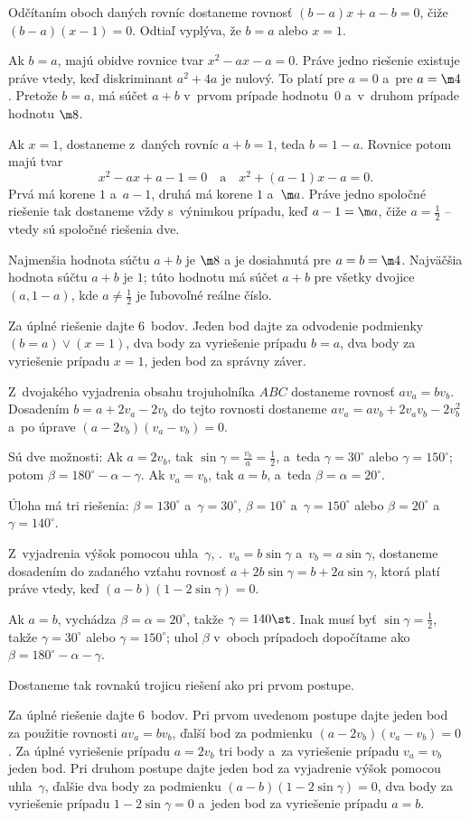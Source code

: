 {%
Odčítaním oboch daných rovníc dostaneme rovnosť $(b-a)x+a-b=0$, čiže $(b-a)(x-1)=0$. Odtiaľ vyplýva, že $b=a$ alebo $x=1$.

Ak $b=a$, majú obidve rovnice tvar $x^2-ax-a=0$. Práve jedno riešenie existuje práve vtedy, keď diskriminant $a^2+4a$ je nulový. To platí pre $a=0$ a~pre $a=\m4$. Pretože $b=a$, má súčet $a+b$ v~prvom prípade hodnotu~$0$ a~v~druhom prípade hodnotu $\m8$.

Ak $x=1$, dostaneme z~daných rovníc $a+b=1$, teda $b=1-a$. Rovnice potom majú tvar
$$
x^2-ax+a-1=0\quad\text{a}\quad x^2+(a-1)x-a=0.
$$
Prvá má korene $1$ a~$a-1$, druhá má korene $1$ a~$\m a$. Práve jedno spoločné riešenie tak dostaneme vždy s~výnimkou prípadu, keď $a-1=\m a$, čiže $a=\frac12$ -- vtedy sú spoločné riešenia dve.

\zaver
Najmenšia hodnota súčtu $a+b$ je $\m8$ a je dosiahnutá pre $a=b=\m4$. Najväčšia hodnota súčtu $a+b$ je $1$; túto hodnotu má súčet $a+b$ pre všetky dvojice $(a,1-a)$, kde $a\ne\frac12$ je ľubovoľné reálne číslo.

\nobreak\medskip\petit\noindent
Za úplné riešenie dajte 6~bodov.
Jeden bod dajte za odvodenie podmienky $(b=a) \vee (x=1)$, dva body za vyriešenie prípadu $b=a$, dva body za vyriešenie prípadu $x=1$, jeden bod za správny záver.
\endpetit
\bigbreak}

{%
Z~dvojakého vyjadrenia obsahu trojuholníka $ABC$ dostaneme rovnosť $av_a=bv_b$. Dosadením $b=a+2v_a-2v_b$ do tejto rovnosti dostaneme $av_a=av_b+2v_av_b-2v_b^2$ a~po úprave $(a-2v_b)(v_a-v_b)=0$.

Sú dve možnosti: Ak $a=2v_b$, tak $\sin\gamma =\frac{v_b}a=\frac12$, a~teda $\gamma=30^\circ$ alebo $\gamma=150^\circ$; potom $\beta=180^\circ-\alpha-\gamma$. Ak $v_a=v_b$, tak $a=b$, a~teda $\beta=\alpha=20^\circ$.

Úloha má tri riešenia: $\beta=130^\circ$ a~$\gamma=30^\circ$, $\beta=10^\circ$ a~$\gamma=150^\circ$ alebo $\beta=20^\circ$ a~$\gamma=140^\circ$.

\ineriesenie
Z~vyjadrenia výšok pomocou uhla~$\gamma$, \tj.~$v_a=b\sin\gamma$ a~$v_b=a\sin\gamma$,
dostaneme dosadením do zadaného vzťahu rovnosť $a+2b\sin\gamma=b+2a\sin\gamma$, ktorá platí práve vtedy, keď
$(a-b)(1-2\sin\gamma)=0$.

Ak $a=b$, vychádza $\beta=\alpha=20^\circ$, takže $\gamma=140\st$. Inak musí byť $\sin \gamma =\frac12$, takže $\gamma=30^\circ$ alebo $\gamma=150^\circ$; uhol $\beta$ v~oboch prípadoch dopočítame ako $\beta=180^\circ-\alpha-\gamma$.

Dostaneme tak rovnakú trojicu riešení ako pri prvom postupe.

\nobreak\medskip\petit\noindent
Za úplné riešenie dajte 6~bodov. Pri prvom uvedenom postupe dajte jeden bod za použitie rovnosti $av_a=bv_b$, ďalší bod za podmienku $(a-2v_b)(v_a-v_b)=0$. Za úplné vyriešenie prípadu $a=2v_b$ tri body a~za vyriešenie prípadu $v_a=v_b$ jeden bod. Pri druhom postupe dajte jeden bod za vyjadrenie výšok pomocou uhla~$\gamma$, ďalšie dva body za podmienku $(a-b)(1-2\sin\gamma)=0$, dva body za vyriešenie prípadu $1-2\sin\gamma=0$ a~jeden bod za vyriešenie prípadu $a=b$.
\endpetit
\bigbreak}


